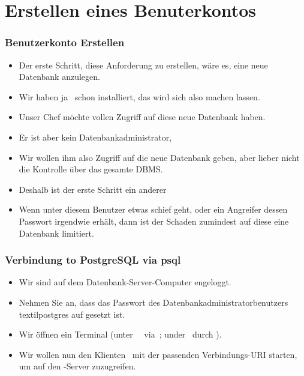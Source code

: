 \documentclass[aspectratio=169,mathserif,notheorems]{beamer}%
\begin{document}
\section{Erstellen eines Benuterkontos}%
%
\begin{frame}%
\frametitle{Benutzerkonto Erstellen}%
\begin{itemize}%
\item Der erste Schritt, diese Anforderung zu erstellen, wäre es, eine neue Datenbank anzulegen.%
\item<2-> Wir haben ja \postgresql\ schon installiert, das wird sich also machen lassen.%
\item<3-> Unser Chef möchte vollen Zugriff auf diese neue Datenbank haben.%
\item<4-> Er ist aber kein Datenbankadministrator,
\item<5-> Wir wollen ihm also Zugriff auf die neue Datenbank geben, aber lieber nicht die Kontrolle über das gesamte DBMS.%
\item<6-> Deshalb ist der erste Schritt ein anderer
\item<8-> Wenn unter diesem Benutzer etwas schief geht, oder ein Angreifer dessen Passwort irgendwie erhält, dann ist der Schaden zumindest auf diese eine Datenbank limitiert.%
\end{itemize}%
\end{frame}%
%
\begin{frame}%
\frametitle{Verbindung to PostgreSQL via psql}%
\begin{itemize}%
\item Wir sind auf dem Datenbank-Server-Computer engeloggt.%
\item<2-> Nehmen Sie an, dass das Passwort des Datenbankadministratorbenutzers \\textil{postgres} auf  gesetzt ist.%
\item<4-> Wir öffnen ein Terminal (unter \ubuntu\ \linux\ via~\ubuntuTerminal; under \microsoftWindows\ durch \windowsTerminal).%
\item<5-> Wir wollen nun den Klienten \psql\ mit der passenden Verbindungs-URI\cite{PGDG:PD} starten, um auf den \postgresql-Server zuzugreifen.%
\end{itemize}%
%
\end{frame}%
\end{document}
